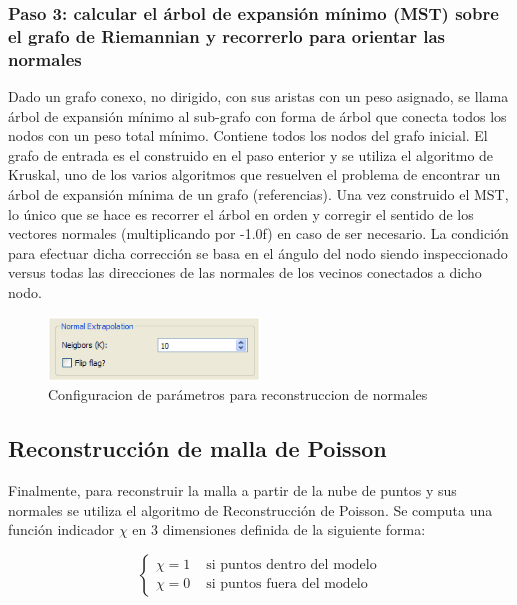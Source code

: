 \subsubsection{Paso 3: calcular el árbol de expansión mínimo (MST) sobre el grafo de Riemannian y recorrerlo para orientar las normales}
Dado un grafo conexo, no dirigido, con sus aristas con un peso asignado, se llama árbol de expansión mínimo al sub-grafo con forma de árbol que conecta todos los nodos con un peso total mínimo. Contiene todos los nodos del grafo inicial. El grafo de entrada es el construido en el paso enterior y se utiliza el algoritmo de Kruskal, uno de los varios algoritmos que resuelven el problema de encontrar un árbol de expansión mínima de un grafo (referencias).
Una vez construido el MST, lo único que se hace es recorrer el árbol en orden y corregir el sentido de los vectores normales (multiplicando por -1.0f) en caso de ser necesario. La condición para efectuar dicha corrección se basa en el ángulo del nodo siendo inspeccionado versus todas las direcciones de las normales de los vecinos conectados a dicho nodo.

\begin{figure}[H]
  \centering
    \includegraphics[width=0.5\textwidth]{./Cap6_reconstruccion/malla-normalextrapolation.png}
  \caption{Configuracion de parámetros para reconstruccion de normales}
  \label{fig:Mesh-Extrapolation}
\end{figure}

\subsection{Reconstrucción de malla de Poisson}

Finalmente, para reconstruir la malla a partir de la nube de puntos y sus normales se utiliza el algoritmo de Reconstrucción de Poisson.
Se computa una función indicador $\chi$ en 3 dimensiones definida de la siguiente forma:

$$
\left\{ \begin{array}{rl}
 \chi = 1 & \mbox{ si puntos dentro del modelo} \\
 \chi = 0 & \mbox{ si puntos fuera del modelo}
       \end{array} \right.
$$

